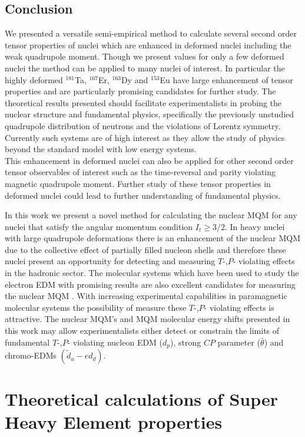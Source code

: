 \documentclass[10pt,a4paper, twoside]{report}
\begin{document}
\chapter{Conclusion} \label{chap:P1Conc}

We presented a versatile semi-empirical method to calculate several second order tensor properties of nuclei which are enhanced in deformed nuclei including the weak quadrupole moment. Though we present values for only a few deformed nuclei the method can be applied to many nuclei of interest. In particular the highly deformed $^{181}$Ta, $^{167}$Er, $^{163}$Dy and $^{153}$Eu have large enhancement of tensor properties and are particularly promising candidates for further study. The theoretical results presented should facilitate experimentalists in probing the nuclear structure and fundamental physics, specifically the previously unstudied quadrupole distribution of neutrons and the violations of Lorentz symmetry. Currently such systems are of high interest  as they allow the study of physics beyond the standard model with low energy systems. \\

This enhancement in deformed nuclei can also be applied for other second order tensor observables of interest such as the time-reversal and parity violating magnetic quadrupole moment. Further study of these tensor properties in deformed nuclei  could lead to further understanding of fundamental physics.

In this work we present a novel method for calculating the nuclear MQM for any nuclei that satisfy the angular momentum condition $I_t \geq 3/2$. In heavy nuclei with large quadrupole deformations there is an enhancement of the nuclear MQM  due to the collective effect of partially filled nucleon shells and therefore these nuclei present an opportunity for detecting and measuring $T$-,$P$- violating effects in the hadronic sector. The molecular systems which have been used to study the electron EDM with promising results are also excellent candidates for measuring the nuclear MQM  \cite{Skripnikov2017, Skripnikov2014ThO}. With increasing experimental capabilities  in paramagnetic molecular systems the possibility of measure these $T$-,$P$- violating effects is attractive. The nuclear MQM's and MQM molecular energy shifts presented in this work may allow experimentalists either detect or constrain the limits of fundamental $T$-,$P$- violating nucleon EDM ($d_p$), strong $CP$ parameter ($\bar{\theta}$) and chromo-EDMs $(\tilde{d}_{u} - e{d}_d) $. 
\part{Theoretical calculations of Super Heavy Element properties}
\end{document}
